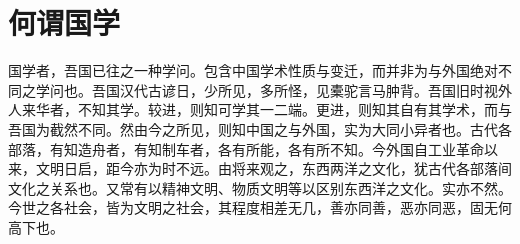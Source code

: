 \chapter{何谓国学}

国学者，吾国已往之一种学问。包含中国学术性质与变迁，而并非为与外国绝对不同之学问也。吾国汉代古谚日，少所见，多所怪，见橐驼言马肿背。吾国旧时视外人来华者，不知其学。较进，则知可学其一二端。更进，则知其自有其学术，而与吾国为截然不同。然由今之所见，则知中国之与外国，实为大同小异者也。古代各部落，有知造舟者，有知制车者，各有所能，各有所不知。今外国自工业革命以来，文明日启，距今亦为时不远。由将来观之，东西两洋之文化，犹古代各部落间文化之关系也。又常有以精神文明、物质文明等以区别东西洋之文化。实亦不然。今世之各社会，皆为文明之社会，其程度相差无几，善亦同善，恶亦同恶，固无何高下也。